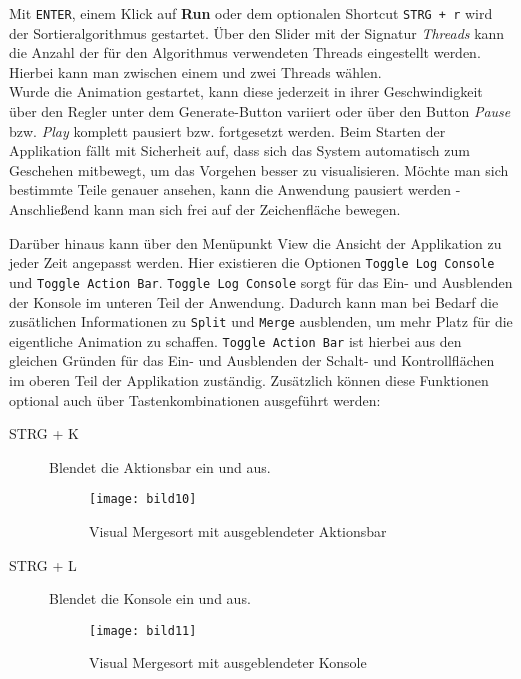 Mit \texttt{ENTER}, einem Klick auf \textbf{Run} oder dem optionalen Shortcut \texttt{STRG + r} wird der Sortieralgorithmus gestartet. Über den Slider mit der Signatur \textit{Threads} kann die Anzahl der für den Algorithmus verwendeten Threads eingestellt werden. Hierbei kann man zwischen einem und zwei Threads wählen.\\
Wurde die Animation gestartet, kann diese jederzeit in ihrer Geschwindigkeit über den Regler unter dem Generate-Button variiert oder über den Button \textit{Pause} bzw. \textit{Play} komplett pausiert bzw. fortgesetzt werden. Beim Starten der Applikation fällt mit Sicherheit auf, dass sich das System automatisch zum Geschehen mitbewegt, um das Vorgehen besser zu visualisieren. Möchte man sich bestimmte Teile genauer ansehen, kann die Anwendung pausiert werden - Anschließend kann man sich frei auf der Zeichenfläche bewegen.

Darüber hinaus kann über den Menüpunkt View die Ansicht der Applikation zu jeder Zeit angepasst werden. Hier existieren die Optionen
\texttt{Toggle Log Console} und \texttt{Toggle Action Bar}. \texttt{Toggle Log Console} sorgt für das Ein- und Ausblenden der Konsole
im unteren Teil der Anwendung. Dadurch kann man bei Bedarf die zusätlichen Informationen zu \texttt{Split} und \texttt{Merge} ausblenden,
um mehr Platz für die eigentliche Animation zu schaffen. \texttt{Toggle Action Bar} ist hierbei aus den gleichen Gründen für das Ein- und Ausblenden
der Schalt- und Kontrollflächen im oberen Teil der Applikation zuständig. Zusätzlich können diese Funktionen optional auch über Tastenkombinationen ausgeführt
werden:

\begin{description}
\item[STRG + K] Blendet die Aktionsbar ein und aus.

\begin{figure}[!htb]
    \centering
      \texttt{[image: bild10]}
    \caption{Visual Mergesort mit ausgeblendeter Aktionsbar}
\end{figure}

\item[STRG + L] Blendet die Konsole ein und aus.

\begin{figure}[!htb]
    \centering
      \texttt{[image: bild11]}
    \caption{Visual Mergesort mit ausgeblendeter Konsole}
\end{figure}
\end{description}

